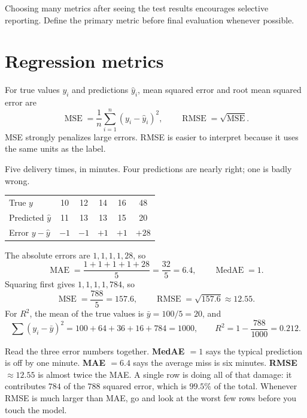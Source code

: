 Choosing many metrics after seeing the test results encourages selective reporting. Define the primary metric before final evaluation whenever possible.

\section{Regression metrics}
\label{sec:regression-metrics}

For true values $y_i$ and predictions $\hat{y}_i$, mean squared error and root mean squared error are
\[
  \operatorname{MSE}
  =\frac{1}{n}\sum_{i=1}^{n}{(y_i-\hat{y}_i)}^2,
  \qquad
  \operatorname{RMSE}=\sqrt{\operatorname{MSE}}.
\]
MSE strongly penalizes large errors. RMSE is easier to interpret because it uses the same units as the label.

\begin{workedexample}
Five delivery times, in minutes. Four predictions are nearly right; one is badly wrong.

\begin{mltable}\small
\begin{tabular}{lccccc}
\toprule
\rowcolor{MLPaleBlue!92}
True $y$            & 10 & 12 & 14 & 16 & 48 \\
Predicted $\hat{y}$ & 11 & 13 & 13 & 15 & 20 \\
Error $y-\hat{y}$   & $-1$ & $-1$ & $+1$ & $+1$ & $+28$ \\
\bottomrule
\end{tabular}
\end{mltable}

The absolute errors are $1,1,1,1,28$, so
\[
  \operatorname{MAE}=\frac{1+1+1+1+28}{5}=\frac{32}{5}=6.4,
  \qquad
  \operatorname{MedAE}=1.
\]
Squaring first gives $1,1,1,1,784$, so
\[
  \operatorname{MSE}=\frac{788}{5}=157.6,
  \qquad
  \operatorname{RMSE}=\sqrt{157.6}\approx 12.55.
\]
For $R^2$, the mean of the true values is $\bar{y}=100/5=20$, and
\[
  \sum{(y_i-\bar{y})}^2=100+64+36+16+784=1000,
  \qquad
  R^2=1-\frac{788}{1000}=0.212.
\]

Read the three error numbers together. \textbf{MedAE $=1$} says the typical prediction is off by one minute. \textbf{MAE $=6.4$} says the average miss is six minutes. \textbf{RMSE $\approx12.55$} is almost twice the MAE. A single row is doing all of that damage: it contributes $784$ of the $788$ squared error, which is $99.5\%$ of the total. Whenever RMSE is much larger than MAE, go and look at the worst few rows before you touch the model.
\end{workedexample}

